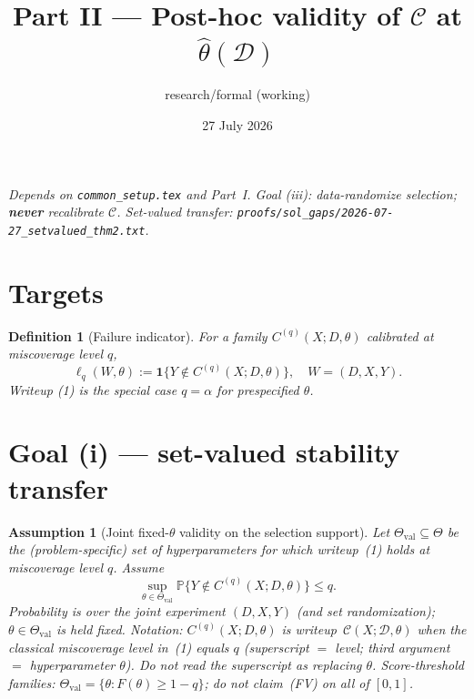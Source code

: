 \documentclass[11pt]{article}
\title{Part II --- Post-hoc validity of $\mathcal{C}$ at $\hat\theta(\mathcal{D})$}
\author{research/formal (working)}
\date{27 July 2026}
\newtheorem{definition}{Definition}
\newtheorem{assumption}{Assumption}
\begin{document}
\maketitle

\noindent\textit{Depends on \texttt{common\_setup.tex} and Part~I.
Goal (iii): data-randomize selection; \textbf{never} recalibrate $\mathcal{C}$.
Set-valued transfer: \texttt{proofs/sol\_gaps/2026-07-27\_setvalued\_thm2.txt}.}

\section{Targets}

\begin{definition}[Failure indicator]
For a family $C^{(q)}(X;D,\theta)$ calibrated at miscoverage level $q$,
\[
\ell_q(W,\theta):=\mathbf{1}\{Y\notin C^{(q)}(X;D,\theta)\},
\quad W=(D,X,Y).
\]
Writeup (1) is the special case $q=\alpha$ for \emph{prespecified} $\theta$.
\end{definition}

\section{Goal (i) --- set-valued stability transfer}

\begin{assumption}[Joint fixed-$\theta$ validity on the selection support]
\label{ass:FV}
Let $\Theta_{\mathrm{val}}\subseteq\Theta$ be the (problem-specific) set of hyperparameters
for which writeup~(1) holds at miscoverage level $q$. Assume
\[
\sup_{\theta\in\Theta_{\mathrm{val}}}
\mathbb{P}\bigl\{Y\notin C^{(q)}(X;D,\theta)\bigr\}\le q.
\tag{FV}
\]
Probability is over the joint experiment $(D,X,Y)$ (and set randomization);
$\theta\in\Theta_{\mathrm{val}}$ is held fixed.
\textit{Notation:} $C^{(q)}(X;D,\theta)$ is writeup~$\mathcal{C}(X;\mathcal{D},\theta)$
when the classical miscoverage level in~(1) equals $q$ (superscript $=$ level;
third argument $=$ hyperparameter $\theta$). Do not read the superscript as replacing $\theta$.
\textit{Score-threshold families:} $\Theta_{\mathrm{val}}=\{\theta:F(\theta)\ge 1-q\}$;
do not claim~(FV) on all of $[0,1]$.
\end{assumption}
\end{document}
